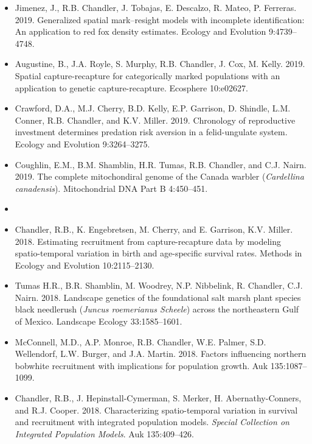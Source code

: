 \documentclass[12pt]{article}
\begin{document}
\begin{itemize}
\item Jimenez, J., R.B. Chandler, J. Tobajas, E. Descalzo, R. Mateo,
  P. Ferreras. 2019. Generalized spatial mark–resight models with
  incomplete identification: An application to red fox density
  estimates. Ecology and Evolution 9:4739--4748. 
  
\item Augustine, B., J.A. Royle, S. Murphy, R.B. Chandler,
  J. Cox, M. Kelly. 2019. Spatial capture-recapture for
  categorically marked populations with an application to genetic
  capture-recapture. Ecosphere 10:e02627.

\item Crawford, D.A., M.J. Cherry, B.D. Kelly, E.P. Garrison,
  D. Shindle, L.M. Conner, R.B. Chandler, and
  K.V. Miller. 2019. Chronology of reproductive investment determines
  predation risk aversion in a felid-ungulate system. Ecology and
  Evolution 9:3264--3275. 

\item Coughlin, E.M., B.M. Shamblin, H.R. Tumas, R.B. Chandler, and
  C.J. Nairn. 2019. The complete mitochondiral genome of the
  Canada warbler ({\it Cardellina canadensis}). Mitochondrial DNA Part
  B 4:450--451.

  
\item[] { \\}

\item Chandler, R.B., K. Engebretsen, M. Cherry, and E. Garrison, 
  K.V. Miller. 2018. Estimating recruitment from
  capture-recapture data by modeling spatio-temporal variation in
  birth and age-specific survival rates. Methods in Ecology and
  Evolution 10:2115--2130.

\item Tumas H.R., B.R. Shamblin, M. Woodrey, N.P. Nibbelink,
  R. Chandler, C.J. Nairn. 2018. Landscape genetics of the
  foundational salt marsh plant species black needlerush ({\it Juncus
    roemerianus Scheele}) across the northeastern Gulf of
  Mexico. Landscape Ecology 33:1585--1601.
  
\item McConnell, M.D., A.P. Monroe, R.B. Chandler, W.E. Palmer,
  S.D. Wellendorf, L.W. Burger, and J.A. Martin. 2018. Factors
  influencing northern bobwhite recruitment with implications for
  population growth. Auk 135:1087--1099.
  
\item Chandler, R.B., J. Hepinstall-Cymerman, S. Merker, H. Abernathy-Conners,
  and R.J. Cooper. 2018. Characterizing spatio-temporal 
  variation in survival and recruitment with integrated population
  models. {\it Special Collection on Integrated Population
    Models}. Auk 135:409--426. 


\end{itemize}
\end{document}
